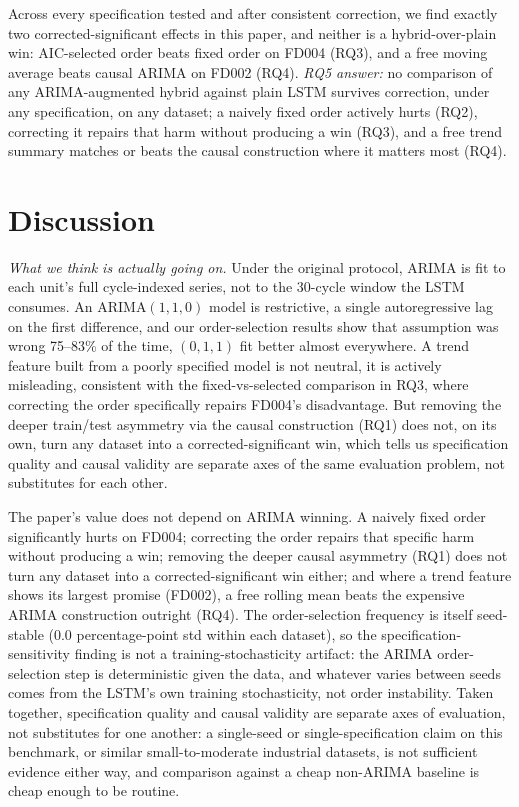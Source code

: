 \documentclass[conference]{IEEEtran}
\begin{document}
Across every specification tested and after consistent correction, we find exactly two corrected-significant effects in this paper, and neither is a hybrid-over-plain win: AIC-selected order beats fixed order on FD004 (RQ3), and a free moving average beats causal ARIMA on FD002 (RQ4). \emph{RQ5 answer:} no comparison of any ARIMA-augmented hybrid against plain LSTM survives correction, under any specification, on any dataset; a naively fixed order actively hurts (RQ2), correcting it repairs that harm without producing a win (RQ3), and a free trend summary matches or beats the causal construction where it matters most (RQ4).

\section{Discussion}
\emph{What we think is actually going on.} Under the original protocol, ARIMA is fit to each unit's full cycle-indexed series, not to the 30-cycle window the LSTM consumes. An ARIMA$(1,1,0)$ model is restrictive, a single autoregressive lag on the first difference, and our order-selection results show that assumption was wrong 75--83\% of the time, $(0,1,1)$ fit better almost everywhere. A trend feature built from a poorly specified model is not neutral, it is actively misleading, consistent with the fixed-vs-selected comparison in RQ3, where correcting the order specifically repairs FD004's disadvantage. But removing the deeper train/test asymmetry via the causal construction (RQ1) does not, on its own, turn any dataset into a corrected-significant win, which tells us specification quality and causal validity are separate axes of the same evaluation problem, not substitutes for each other.

The paper's value does not depend on ARIMA winning. A naively fixed order significantly hurts on FD004; correcting the order repairs that specific harm without producing a win; removing the deeper causal asymmetry (RQ1) does not turn any dataset into a corrected-significant win either; and where a trend feature shows its largest promise (FD002), a free rolling mean beats the expensive ARIMA construction outright (RQ4). The order-selection frequency is itself seed-stable (0.0 percentage-point std within each dataset), so the specification-sensitivity finding is not a training-stochasticity artifact: the ARIMA order-selection step is deterministic given the data, and whatever varies between seeds comes from the LSTM's own training stochasticity, not order instability. Taken together, specification quality and causal validity are separate axes of evaluation, not substitutes for one another: a single-seed or single-specification claim on this benchmark, or similar small-to-moderate industrial datasets, is not sufficient evidence either way, and comparison against a cheap non-ARIMA baseline is cheap enough to be routine.
\end{document}
